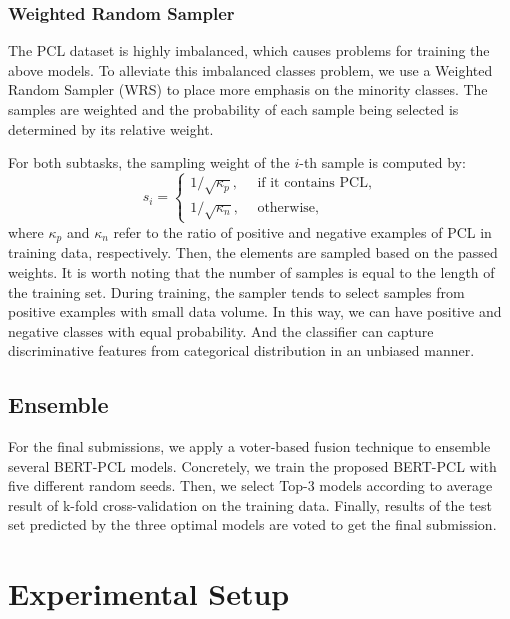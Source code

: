 \documentclass[11pt]{article}
\begin{document}
\subsubsection{Weighted Random Sampler}
The PCL dataset is highly imbalanced, which causes problems for training the above models. 
To alleviate this imbalanced classes problem, we use a Weighted Random Sampler (WRS) to place more emphasis on the minority classes.
The samples are weighted and the probability of each sample being selected is determined by its relative weight.

For both subtasks, the sampling weight of the $i$-th sample is computed by: 
\begin{equation}
    s_i = \left\{
\begin{aligned}
1/\sqrt{\kappa_p}, & \ \  \text{if it contains PCL,} \\
1/\sqrt{\kappa_n}, & \ \  \text{otherwise,}
\end{aligned}
\right.
\end{equation}
where $\kappa_{p}$ and $\kappa_{n}$ refer to the ratio of positive and negative examples of PCL in training data, respectively. Then, the elements are sampled based on the passed weights. 
It is worth noting that the number of samples is equal to the length of the training set. 
During training, the sampler tends to select samples from positive examples with small data volume. 
In this way, we can have positive and negative classes with equal probability. And the classifier can capture discriminative features from categorical distribution in an unbiased manner.






\subsection{Ensemble}
For the final submissions, we apply a voter-based fusion technique \citep{DBLP:conf/sspr/MorvantHA14} to ensemble several BERT-PCL models.
Concretely, we train the proposed BERT-PCL with five different random seeds. 
Then, we select Top-3 models according to average result of k-fold cross-validation on the training data.
Finally, results of the test set predicted by the three optimal models are voted to get the final submission.



\section{Experimental Setup}
\end{document}
